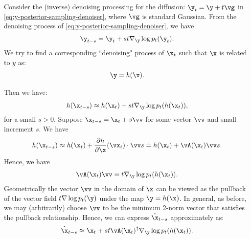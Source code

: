 \documentclass[../../book-main.tex]{subfiles}
\begin{document}
Consider the (inverse) denoising processing for the diffusion: $\y_t = \y + t\vg $ in \eqref{eq:y-posterior-sampling-denoiser}, where $\vg$ is standard Gaussian. From the denoising process of \eqref{eq:y-posterior-sampling-denoiser}, we have
\begin{equation}
    \y_{t-s} =  \y_t + st \nabla_{\y} \log p_t(\y_t).
\end{equation}
We try to find a corresponding ``denoising" process of $\x_t$ such that $\x$ is related to $y$ as:
\begin{equation}
    \y =  h(\x).
\end{equation}

Then we have:
\begin{equation}
    h(\x_{t-s}) \approx  h(\x_t) + st \nabla_{\y} \log p_t(h(\x_t)),
\end{equation}
for a small $s >0$. 
Suppose $\x_{t-s} = \x_t + s \vv$ for some vector $\vv$ and small increment $s$. We have
\begin{equation}
    h(\x_{t-s}) \approx h(\x_t) + \frac{\partial h}{\partial \x}(\vx_{t}) \cdot \vv s \doteq h(\x_t) + \vA(\x_t) \vv s. 
\end{equation}
Hence, we have
\begin{equation}
    \vA(\x_t) \vv = t \nabla_{\y} \log p_t(h(\x_t)).
    \label{eqn:pushforward}
\end{equation}
Geometrically the vector $\vv$ in the domain of $\x$ can be viewed as the pullback of the vector field $t \nabla \log p_t(\y)$ under the map $\y = h(\x)$. In general, as before, we may (arbitrarily) choose $\vv$ to be the minimum 2-norm vector that satisfies the pullback relationship. Hence, we can express  $\hat{\x}_{t-s}$ approximately as:
\begin{equation}
    \hat{\x}_{t-s} \approx \x_t + st\vA(\x_t)^\dagger \nabla_{\y} \log p_t(h(\x_t)). 
\label{eqn:pullback-denoise}
\end{equation}
\end{document}
